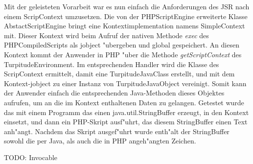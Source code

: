 Mit der geleisteten Vorarbeit war es nun einfach die Anforderungen des JSR nach einem ScripContext umzusetzen. Die von der PHPScriptEngine erweiterte Klasse
AbstactScriptEngine bringt eine Kontextimplementation namens SimpleContext mit. Dieser Kontext wird beim Aufruf der nativen Methode \emph{exec} des PHPCompiledScripts
als jobject "ubergeben und global gespeichert. An diesen Kontext kommt der Anwender in PHP "uber die Methode \emph{getScriptContext} des TurpitudeEnvironment. Im 
entsprechenden Handler wird die Klasse des ScripContext ermittelt, damit eine TurpitudeJavaClass erstellt, und mit dem Kontext-jobject zu einer Instanz von
TurpitudeJavaObject vereinigt. Somit kann der Anwender einfach die entsprechenden Java-Methoden dieses Objektes aufrufen, um an die im Kontext enthaltenen Daten zu
gelangen. Getestet wurde das mit einem Programm das einen java.util.StringBuffer erzeugt, in den Kontext einsetzt, und dann ein PHP-Skript ausf"uhrt, das diesem
StringBuffer einen Text anh"angt. Nachdem das Skript ausgef"uhrt wurde enth"alt der StringBuffer sowohl die per Java, als auch die in PHP angeh"angten Zeichen.

TODO: Invocable

